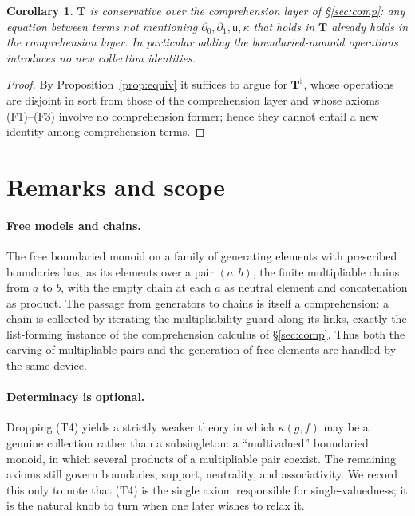\documentclass[11pt]{article}
\theoremstyle{definition}
\theoremstyle{plain}
\newtheorem{corollary}[definition]{Corollary}
\newcommand{\dl}{\partial_{0}}          %
\newcommand{\dr}{\partial_{1}}          %
\newcommand{\uu}{\mathsf{u}}            %
\newcommand{\kk}{\kappa}                %
\begin{document}
\begin{corollary}
$\mathbf{T}$ is conservative over the comprehension layer of
\S\ref{sec:comp}: any equation between terms not mentioning $\dl,\dr,\uu,\kk$
that holds in $\mathbf{T}$ already holds in the comprehension layer. In
particular adding the boundaried-monoid operations introduces no new
collection identities.
\end{corollary}
\begin{proof}
By Proposition~\ref{prop:equiv} it suffices to argue for $\mathbf{T}^{\flat}$,
whose operations are disjoint in sort from those of the comprehension layer and
whose axioms (F1)--(F3) involve no comprehension former; hence they cannot
entail a new identity among comprehension terms.
\end{proof}

\section{Remarks and scope}\label{sec:remarks}

\paragraph{Free models and chains.}
The free boundaried monoid on a family of generating elements with prescribed
boundaries has, as its elements over a pair $(a,b)$, the finite multipliable
chains from $a$ to $b$, with the empty chain at each $a$ as neutral element and
concatenation as product. The passage from generators to chains is itself a
comprehension: a chain is collected by iterating the multipliability guard along
its links, exactly the list-forming instance of the comprehension calculus of
\S\ref{sec:comp}. Thus both the carving of multipliable pairs and the
generation of free elements are handled by the same device.

\paragraph{Determinacy is optional.}
Dropping (T4) yields a strictly weaker theory in which $\kk(g,f)$ may be a
genuine collection rather than a subsingleton: a ``multivalued'' boundaried
monoid, in which several products of a multipliable pair coexist. The remaining
axioms still govern boundaries, support, neutrality, and associativity. We
record this only to note that (T4) is the single axiom responsible for
single-valuedness; it is the natural knob to turn when one later wishes to
relax it.
\end{document}
